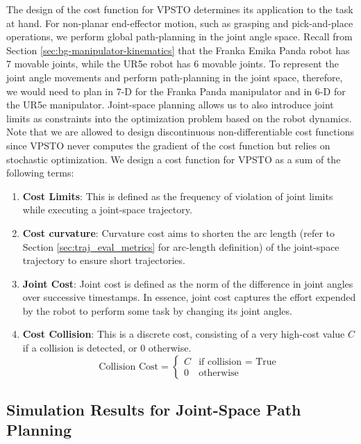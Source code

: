 The design of the cost function for VPSTO determines its application to the task at hand. For non-planar end-effector motion, such as grasping and pick-and-place operations, we perform global path-planning in the joint angle space. Recall from Section \ref{sec:bg-manipulator-kinematics} that the Franka Emika Panda robot has 7 movable joints, while the UR5e robot has 6 movable joints. To represent the joint angle movements and perform path-planning in the joint space, therefore, we would need to plan in 7-D for the Franka Panda manipulator and in 6-D for the UR5e manipulator. Joint-space planning allows us to also introduce joint limits as constraints into the optimization problem based on the robot dynamics. Note that we are allowed to design discontinuous non-differentiable cost functions since VPSTO never computes the gradient of the cost function but relies on stochastic optimization. We design a cost function for VPSTO as a sum of the following terms:

\begin{enumerate}
    \item \textbf{Cost Limits}: This is defined as the frequency of violation of joint limits while executing a joint-space trajectory. 
    \item \textbf{Cost curvature}: Curvature cost aims to shorten the arc length (refer to Section \ref{sec:traj_eval_metrics} for arc-length definition) of the joint-space trajectory to ensure short trajectories. 
    \item \textbf{Joint Cost}: Joint cost is defined as the norm of the difference in joint angles over successive timestamps. In essence, joint cost captures the effort expended by the robot to perform some task by changing its joint angles. 
    \item \textbf{Cost Collision}: This is a discrete cost, consisting of a very high-cost value $C$ if a collision is detected, or 0 otherwise. 
    \begin{equation}
        \text{Collision Cost} = \begin{cases} 
      C & \text{if collision = True} \\
      0 & \text{otherwise} 
   \end{cases}
    \end{equation}
    
\end{enumerate}

\subsection{Simulation Results for Joint-Space Path Planning}

